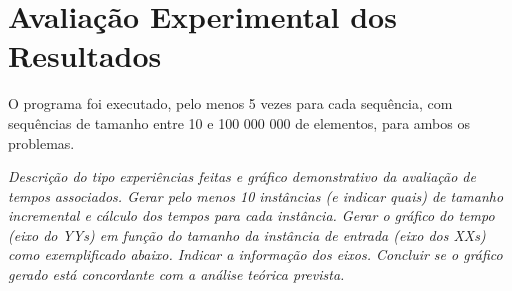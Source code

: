 \documentclass[12pt,a4paper]{article}
\begin{document}
  \section{Avaliação Experimental dos Resultados}

  O programa foi executado, pelo menos 5 vezes para cada sequência, com sequências de tamanho entre 10 e 100 000 000 de elementos, para ambos os problemas.

  \textit{Descrição do tipo experiências feitas e gráfico demonstrativo da avaliação de tempos associados.
  Gerar pelo menos 10 instâncias (e indicar quais) de tamanho incremental e cálculo dos tempos para cada instância.
  Gerar o gráfico do tempo (eixo do YYs) em função do tamanho da instância de entrada (eixo dos XXs) como exemplificado abaixo. Indicar a informação dos eixos. Concluir se o gráfico gerado está concordante com a análise teórica prevista.}
\end{document}
